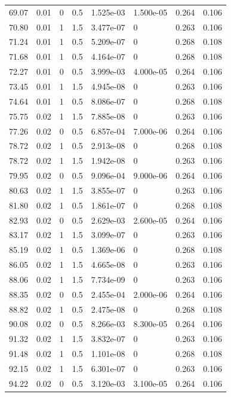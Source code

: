 \documentclass[preview]{standalone}
\begin{document}
{{{\begin{tabular}{L{1.2cm}C{1.2cm} C{0.3cm}C{0.5cm} C{1.4cm}C{1.4cm} C{1.4cm}C{1.4cm}}
  69.07  &  0.01  & 0     & 0.5 &  1.525e-03  & 1.500e-05  & 0.264 &  0.106   \\ 
  70.80  &  0.01  & 1     & 1.5 &  3.477e-07  & 0  & 0.263 &  0.106   \\ 
  71.24  &  0.01  & 1     & 0.5 &  5.209e-07  & 0  & 0.268 &  0.108   \\ 
  71.68  &  0.01  & 1     & 0.5 &  4.164e-07  & 0  & 0.268 &  0.108   \\ 
  72.27  &  0.01  & 0     & 0.5 &  3.999e-03  & 4.000e-05  & 0.264 &  0.106   \\ 
  73.45  &  0.01  & 1     & 1.5 &  4.945e-08  & 0  & 0.263 &  0.106   \\ 
  74.64  &  0.01  & 1     & 0.5 &  8.086e-07  & 0  & 0.268 &  0.108   \\ 
  75.75  &  0.02  & 1     & 1.5 &  7.885e-08  & 0  & 0.263 &  0.106   \\ 
  77.26  &  0.02  & 0     & 0.5 &  6.857e-04  & 7.000e-06  & 0.264 &  0.106   \\ 
  78.72  &  0.02  & 1     & 0.5 &  2.913e-08  & 0  & 0.268 &  0.108   \\ 
  78.72  &  0.02  & 1     & 1.5 &  1.942e-08  & 0  & 0.263 &  0.106   \\ 
  79.95  &  0.02  & 0     & 0.5 &  9.096e-04  & 9.000e-06  & 0.264 &  0.106   \\ 
  80.63  &  0.02  & 1     & 1.5 &  3.855e-07  & 0  & 0.263 &  0.106   \\ 
  81.80  &  0.02  & 1     & 0.5 &  1.861e-07  & 0  & 0.268 &  0.108   \\ 
  82.93  &  0.02  & 0     & 0.5 &  2.629e-03  & 2.600e-05  & 0.264 &  0.106   \\ 
  83.17  &  0.02  & 1     & 1.5 &  3.099e-07  & 0  & 0.263 &  0.106   \\ 
  85.19  &  0.02  & 1     & 0.5 &  1.369e-06  & 0  & 0.268 &  0.108   \\ 
  86.05  &  0.02  & 1     & 1.5 &  4.665e-08  & 0  & 0.263 &  0.106   \\ 
  88.06  &  0.02  & 1     & 1.5 &  7.734e-09  & 0  & 0.263 &  0.106   \\ 
  88.35  &  0.02  & 0     & 0.5 &  2.455e-04  & 2.000e-06  & 0.264 &  0.106   \\ 
  88.82  &  0.02  & 1     & 0.5 &  2.475e-08  & 0  & 0.268 &  0.108   \\ 
  90.08  &  0.02  & 0     & 0.5 &  8.266e-03  & 8.300e-05  & 0.264 &  0.106   \\ 
  91.32  &  0.02  & 1     & 1.5 &  3.832e-07  & 0  & 0.263 &  0.106   \\ 
  91.48  &  0.02  & 1     & 0.5 &  1.101e-08  & 0  & 0.268 &  0.108   \\ 
  92.15  &  0.02  & 1     & 1.5 &  6.301e-07  & 0  & 0.263 &  0.106   \\ 
  94.22  &  0.02  & 0     & 0.5 &  3.120e-03  & 3.100e-05  & 0.264 &  0.106   \\ 
\hline 
\end{tabular} 

}}}
\end{document}
